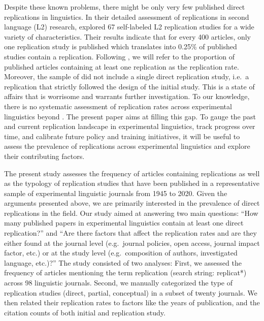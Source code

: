 \documentclass[cm,linguex]{glossa}
\begin{document}
Despite these known problems, there might be only very few published direct replications in linguistics. In their detailed assessment of replications in second language (L2) research, \citet{marsden_replication_2018} explored 67 self-labeled L2 replication studies for a wide variety of characteristics. Their results indicate that for every 400 articles, only one replication study is published which translates into 0.25\% of published studies contain a replication. Following \citet{makel_replications_2012}, we will refer to the proportion of published articles containing at least one replication as the replication rate.
Moreover, the sample of \citet{marsden_replication_2018} did not include a single direct replication study, i.e.~a replication that strictly followed the design of the initial study. This is a state of affairs that is worrisome and warrants further investigation. To our knowledge, there is no systematic assessment of replication rates across experimental linguistics beyond \citet{marsden_replication_2018}. The present paper aims at filling this gap. To gauge the past and current replication landscape in experimental linguistics, track progress over time, and calibrate future policy and training initiatives, it will be useful to assess the prevalence of replications across experimental linguistics and explore their contributing factors.

The present study assesses the frequency of articles containing replications as well as the typology of replication studies that have been published in a representative sample of experimental linguistic journals from 1945 to 2020.
Given the arguments presented above, we are primarily interested in the prevalence of direct replications in the field.
Our study aimed at answering two main questions: ``How many published papers in experimental linguistics contain at least one direct replication?'' and ``Are there factors that affect the replication rates and are they either found at the journal level (e.g.~journal policies, open access, journal impact factor, etc.) or at the study level (e.g.~composition of authors, investigated language, etc.)?''
The study consisted of two analyses:
First, we assessed the frequency of articles mentioning the term replication (search string: replicat*) across 98 linguistic journals.
Second, we manually categorized the type of replication studies (direct, partial, conceptual) in a subset of twenty journals. We then related their replication rates to factors like the years of publication, and the citation counts of both initial and replication study.
\end{document}
